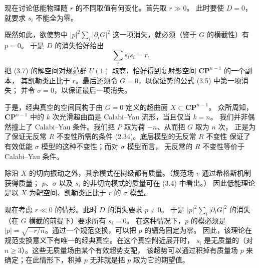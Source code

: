 现在讨论低能物理随 $r$ 的不同取值有何变化。首先取 $r\gg0$。
此时要使 $D=0$，就要求 $s_i$ 不能全为零。

\label{op:18}

既然如此，欲使势中 $|p|^2\sum_i|\partial_iG|^2$ 这一项消失，就必须（鉴于 $G$ 的横截性）有 $p=0$。
于是 $D$ 的消失恰好给出
\begin{equation}
\sum_i\bar s_is_i=r.
\tag{3.7}
\end{equation}
把 (3.7) 的解空间对规范群 $U(1)$ 取商，恰好得到复射影空间 $\mathbf{CP}^{n-1}$ 的一个副本，
其凯勒类正比于 $r$。最后还须令 $G=0$，以保证势的公式 (3.5) 中第一项消失；
并令 $\sigma=0$，以保证最后一项消失。

于是，经典真空的空间同构于由 $G=0$ 定义的超曲面 $X\subset\mathbf{CP}^{n-1}$。
众所周知，$\mathbf{CP}^{n-1}$ 中的 $k$ 次光滑超曲面是 Calabi--Yau 流形，当且仅当 $k=n$。
我们并非偶然撞上了 Calabi--Yau 条件。我们把 $P$ 取为荷 $-n$、从而把 $G$ 取为 $n$ 次，
正是为了保证无反常 $R$ 不变性所需的条件 (2.34)。底层模型的无反常 $R$ 不变性
保证了有效低能 $\sigma$ 模型的这种不变性；而对 $\sigma$ 模型而言，
无反常的 $R$ 不变性等价于 Calabi--Yau 条件。

除沿 $X$ 的切向振动之外，其余模式在树级都有质量。（规范场 $v$ 通过希格斯机制获得质量；
$p$、$\sigma$ 以及 $s_i$ 的非切向模式的质量可在 (3.4) 中看出。）
因此低能理论是以 $X$ 为靶空间、凯勒类正比于 $r$ 的 $\sigma$ 模型。

现在考虑 $r\ll0$ 的情形。此时 $D$ 的消失要求 $p\neq0$。
于是 $|p|^2\sum_i|\partial_iG|^2$ 的消失（在 $G$ 横截的前提下）要求所有 $s_i=0$。
在这种情况下，$p$ 的模必须是 $|p|=\sqrt{-r/n}$。通过一个规范变换，可以把 $p$ 的辐角固定为零。
因此，该理论在规范变换意义下有唯一的经典真空。在这个真空附近展开时，
$s_i$ 是无质量的（对 $n\ge3$）。这些无质量场由某个有效超势支配，
该超势可以通过积掉有质量场 $p$ 来确定；在此情形下，积掉 $p$ 无非就是把 $p$ 取为它的期望值。


